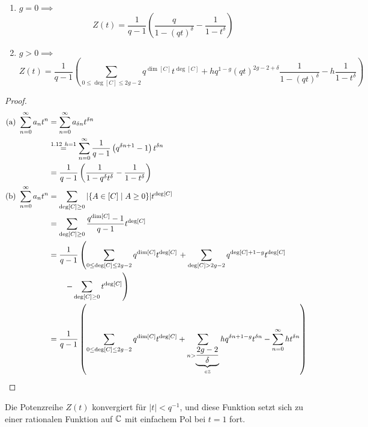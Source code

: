 \begin{satz}
    \begin{enumerate}[label=(\alph*)]
        \item $g=0 \implies$ 
        $$ Z(t) = \frac{1}{q-1}\left(\frac{q}{1-(qt)^\delta} - \frac{1}{1-t^\delta}\right)$$
        \item $g > 0 \implies$
        $$ Z(t) = \frac{1}{q-1}\left(\sum_{0\leq\deg[C]\leq 2g-2}q^{\dim [C]}t^{\deg [C]}+hq^{1-g}(qt)^{2g-2+\delta}\frac{1}{1-(qt)^{\delta}}
        - h\frac{1}{1-t^\delta}
        \right)$$
    \end{enumerate}
\end{satz}
\begin{proof}
    \begin{align*}
        \text{(a) } \sum_{n=0}^\infty a_n t^n & = \sum_{n=0}^\infty a_{\delta n}t^{\delta n}\\
        & \stackrel{1.12~h=1}{=} \sum_{n=0}^\infty \frac{1}{q-1}\left(q^{\delta n +1}-1\right)t^{\delta n}\\
        & = \frac{1}{q-1} \left(\frac{1}{1-q^\delta t^\delta} - \frac{1}{1 - t^\delta}\right)\\
        \text{(b) } \sum_{n=0}^\infty a_n t^n & = \sum_{\deg [C] \geq 0} |\{A \in [C] \mid A \geq 0\}|t^{\deg [C]}\\
        & = \sum_{\deg [C] \geq 0} \frac{q^{\dim [C]}-1}{q-1} t^{\deg [C]}\\
        & = \frac{1}{q-1}\left(\sum_{0 \leq \deg [C] \leq 2g - 2} q^{\dim [C]} t^{\deg [C]}\right.
            + \sum_{\deg [C] > 2g -2} q^{\deg [C] + 1 - g} t^{\deg [C]}\\
            & \left. \qquad - \sum_{\deg [C] \geq 0} t^{\deg [C]}\right)\\
        & = \frac{1}{q-1}\left(\sum_{0 \leq \deg [C] \leq 2g - 2} q^{\dim [C]} t^{\deg [C]} 
            + \sum_{n > \underbrace{\frac{2g -2}{\delta}}_{\in \mathbb{Z}}} hq^{\delta n + 1-g}t^{\delta n}
            - \sum_{n=0}^\infty h t^{\delta n} \right)
    \end{align*}
\end{proof}

\begin{korollar}
    Die Potenzreihe $Z(t)$ konvergiert für $|t| < q^{-1}$, und diese Funktion setzt sich zu einer rationalen Funktion
    auf $\mathbb{C}$ mit einfachem Pol bei $t=1$ fort.
\end{korollar}
